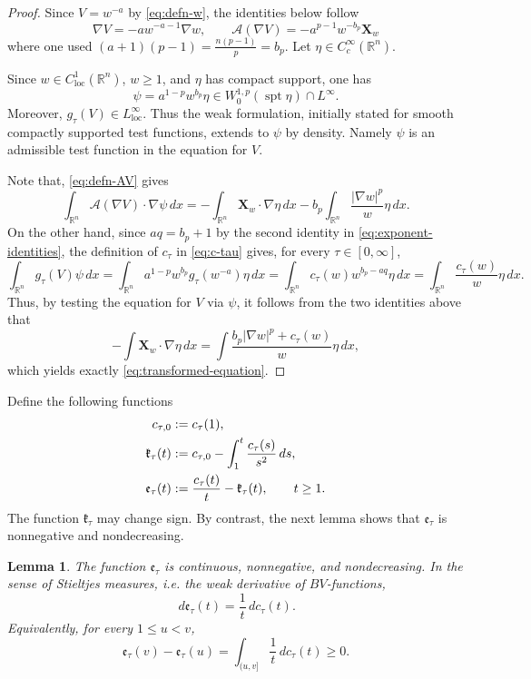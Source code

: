 \documentclass[reqno,12pt]{amsart}
\numberwithin{equation}{section}
\newtheorem{lem}[thm]{Lemma}
\theoremstyle{remark}
\newcommand{\R}{\mathbb R}
\newcommand{\dd}{\,d}
\newcommand{\loc}{\mathrm{loc}}
\newcommand{\Acal}{\mathcal A}
\newcommand{\Xbf}{\mathbf X}
\begin{document}
\begin{proof}
Since $V=w^{-a}$ by \eqref{eq:defn-w}, the identities below follow
\begin{equation}\label{eq:defn-AV}
   \nabla V=-aw^{-a-1}\nabla w, \qquad \Acal(\nabla V)=-a^{p-1}w^{-b_p}\Xbf_w 
\end{equation}
where one used $(a+1)(p-1)=\frac{n(p-1)}{p}=b_p$.  Let $\eta\in C_c^\infty(\R^n)$.  

Since $w\in C^1_{\loc}(\R^n)$, $w\ge 1$, and
$\eta$ has compact support, one has
$$
\psi=a^{1-p}w^{b_p}\eta \in W^{1,p}_0(\operatorname{spt}\eta)\cap L^\infty.
$$
Moreover, $g_\tau(V)\in L^\infty_{\loc}$.
Thus the weak formulation, initially stated for smooth compactly supported test functions, extends to $\psi$ by density. Namely $\psi$ is an admissible test function in the equation for $V$.  

Note that, \eqref{eq:defn-AV} gives
$$
\int_{\R^n}\Acal(\nabla V)\cdot\nabla\psi\,dx
=-\int_{\R^n}\Xbf_w\cdot\nabla\eta\,dx -b_p\int_{\R^n}\frac{|\nabla w|^p}{w}\eta\,dx.
$$
On the other hand,  since  $aq=b_p+1$ by the second identity in \eqref{eq:exponent-identities},  the definition of
$c_\tau$ in \eqref{eq:c-tau} gives, for every $\tau\in[0,\infty]$,
$$
\int_{\R^n}g_\tau(V)\psi\,dx
= \int_{\R^n} a^{1-p}w^{b_p}g_\tau(w^{-a})\eta\,dx 
= \int_{\R^n} c_\tau(w)w^{b_p-aq}\eta\,dx
= \int_{\R^n}\frac{c_\tau(w)}w\eta\,dx.
$$
Thus, by testing the equation for $V$ via $\psi$, it follows from the two identities above that
$$
 -\int\Xbf_w\cdot\nabla\eta\,dx  =\int\frac{b_p|\nabla w|^p+c_\tau(w)}w\eta\,dx,
$$
which yields exactly \eqref{eq:transformed-equation}.
\end{proof}

Define the following functions
\begin{align}
 c_{\tau,0}&:=c_\tau(1), \notag\\
 \mathfrak k_\tau(t)&:=c_{\tau,0}
-\int_1^t\frac{c_\tau(s)}{s^2}\dd s,\label{eq:defect-functions}\\
 \mathfrak e_\tau(t)&:=\frac{c_\tau(t)}t-\mathfrak k_\tau(t),
 \qquad t\ge1. \notag
\end{align}
The function $\mathfrak k_\tau$ may change sign.
By contrast, the next lemma shows that
$\mathfrak e_\tau$ is nonnegative and nondecreasing.

\begin{lem}
The function $\mathfrak e_\tau$ is continuous, nonnegative, and nondecreasing.  In the sense of Stieltjes measures, i.e. the weak derivative of $BV$-functions,
\begin{equation}\label{eq:stieltjes-defect}
\dd\mathfrak e_\tau(t)=\frac1t\dd c_\tau(t).
\end{equation}
Equivalently, for every $1\le u<v$,
\begin{equation}\label{eq:int-ctau}
\mathfrak e_\tau(v)-\mathfrak e_\tau(u) =\int_{(u,v]}\frac 1 t \dd c_\tau(t)\ge 0.
\end{equation}
\end{lem}
\end{document}
